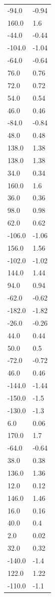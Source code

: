 \begin{longtable}{ll}
-94.0 & -0.94 \\
160.0 & 1.6 \\
-44.0 & -0.44 \\
-104.0 & -1.04 \\
-64.0 & -0.64 \\
76.0 & 0.76 \\
72.0 & 0.72 \\
54.0 & 0.54 \\
46.0 & 0.46 \\
-84.0 & -0.84 \\
48.0 & 0.48 \\
138.0 & 1.38 \\
138.0 & 1.38 \\
34.0 & 0.34 \\
160.0 & 1.6 \\
36.0 & 0.36 \\
98.0 & 0.98 \\
62.0 & 0.62 \\
-106.0 & -1.06 \\
156.0 & 1.56 \\
-102.0 & -1.02 \\
144.0 & 1.44 \\
94.0 & 0.94 \\
-62.0 & -0.62 \\
-182.0 & -1.82 \\
-26.0 & -0.26 \\
44.0 & 0.44 \\
50.0 & 0.5 \\
-72.0 & -0.72 \\
46.0 & 0.46 \\
-144.0 & -1.44 \\
-150.0 & -1.5 \\
-130.0 & -1.3 \\
6.0 & 0.06 \\
170.0 & 1.7 \\
-64.0 & -0.64 \\
38.0 & 0.38 \\
136.0 & 1.36 \\
12.0 & 0.12 \\
146.0 & 1.46 \\
16.0 & 0.16 \\
40.0 & 0.4 \\
2.0 & 0.02 \\
32.0 & 0.32 \\
-140.0 & -1.4 \\
122.0 & 1.22 \\
-110.0 & -1.1 \\

\end{longtable}
